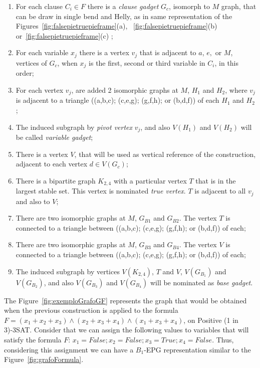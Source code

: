 \documentclass[a4paper,11pt]{article}
\begin{document}
\begin{enumerate}
\item For each clause $C_i \in F$ there is a  \textit{clause gadget} $G_{c}$, isomorph to $M$ graph, that can be draw in single bend and Helly, as in same representation of the Figures~\ref{fig:falsepietruepieframe}(a), ~\ref{fig:falsepietruepieframe}(b) or~\ref{fig:falsepietruepieframe}(c)  ;

\item For each variable $x_{j}$ there is a vertex $v_{j}$ that is adjacent to $a$, $e,$ or $M$, vertices of $G_c$, when $x_{j}$ is the first, second or third variable in $C_i$, in this order;

\item For each vertex $v_{j}$, are added 2 isomorphic graphs  at $M$, $H_1$ and $H_2$, where $v_{j}$ is  adjacent to a triangle ((a,b,c); (c,e,g); (g,f,h); or (b,d,f)) of each $H_1$ and $H_2$; 

\item The induced subgraph by \emph{pivot vertex}  $v_{j}$, and also $V(H_1)$ and $V(H_2)$ will be called \emph{variable gadget}; 

\item There is a vertex $V$, that will be used as vertical reference of the construction, adjacent to each vertex  $d \in V(G_c)$;

\item There is a bipartite graph $K_{2,4}$ with a particular vertex $T$ that is in the largest stable set. This vertex is nominated \emph{true vertex}. $T$ is adjacent to all $v_{j}$ and also to $V$;

\item There are two isomorphic graphs at $M$, $G_{B1}$ and $G_{B2}$. The vertex $T$ is connected to a triangle between ((a,b,c); (c,e,g); (g,f,h); or (b,d,f)) of each;


\item There are two isomorphic graphs at $M$, $G_{B3}$ and $G_{B4}$. The vertex $V$ is connected to a triangle between ((a,b,c); (c,e,g); (g,f,h); or (b,d,f)) of each;

\item The induced subgraph by vertices $V(K_{2,4})$, $T$ and $V$,  $V(G_{B_1})$ and $V(G_{B_2})$, and also $V(G_{B_3})$ and $V(G_{B_4})$ will be nominated as \emph{base gadget}. 
\end{enumerate}


The Figure~\ref{fig:exemploGrafoGF} represents the graph that would be obtained when the previous construction is applied to the formula $ F = (x_1 + x_2 + x_3) \wedge (x_2 + x_3 + x_4) \wedge (x_1 + x_3 + x_4) $, on {\sc Positive (1 in 3)-3SAT}. %
 Consider that we can assign the following values to variables that will satisfy the formula $F$: $x_1 = False; x_2 = False; x_3 = True; x_4 = False$. Thus, considering this assignment we can have a $B_1$-EPG representation similar to the Figure~\ref{fig:grafoFormula}.
\end{document}

